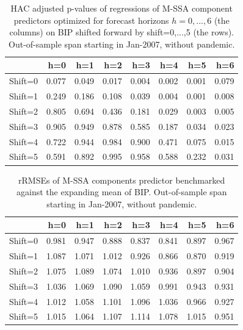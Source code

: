 \documentclass[a4paper]{article}
\begin{document}

\begin{table}[ht]
\centering
\begin{tabular}{rrrrrrrr}
  \hline
 & h=0 & h=1 & h=2 & h=3 & h=4 & h=5 & h=6 \\ 
  \hline
Shift=0 & 0.077 & 0.049 & 0.017 & 0.004 & 0.002 & 0.001 & 0.079 \\ 
  Shift=1 & 0.249 & 0.186 & 0.108 & 0.039 & 0.004 & 0.001 & 0.008 \\ 
  Shift=2 & 0.805 & 0.694 & 0.436 & 0.181 & 0.029 & 0.003 & 0.005 \\ 
  Shift=3 & 0.905 & 0.949 & 0.878 & 0.585 & 0.187 & 0.034 & 0.023 \\ 
  Shift=4 & 0.722 & 0.944 & 0.984 & 0.900 & 0.471 & 0.075 & 0.015 \\ 
  Shift=5 & 0.591 & 0.892 & 0.995 & 0.958 & 0.588 & 0.232 & 0.031 \\ 
   \hline
\end{tabular}
\caption{HAC adjusted p-values of regressions of M-SSA component predictors optimized for forecast horizons $h=0,...,6$  (the columns) on BIP shifted forward by shift=0,...,5 (the rows). Out-of-sample span starting in Jan-2007, without pandemic.} 
\label{p_val_wc}
\end{table}%
\begin{table}[ht]
\centering
\begin{tabular}{rrrrrrrr}
  \hline
 & h=0 & h=1 & h=2 & h=3 & h=4 & h=5 & h=6 \\ 
  \hline
Shift=0 & 0.981 & 0.947 & 0.888 & 0.837 & 0.841 & 0.897 & 0.967 \\ 
  Shift=1 & 1.087 & 1.071 & 1.012 & 0.926 & 0.866 & 0.870 & 0.919 \\ 
  Shift=2 & 1.075 & 1.089 & 1.074 & 1.010 & 0.936 & 0.897 & 0.904 \\ 
  Shift=3 & 1.036 & 1.069 & 1.090 & 1.059 & 0.991 & 0.943 & 0.931 \\ 
  Shift=4 & 1.012 & 1.058 & 1.101 & 1.096 & 1.036 & 0.966 & 0.927 \\ 
  Shift=5 & 1.015 & 1.064 & 1.107 & 1.114 & 1.078 & 1.015 & 0.951 \\ 
   \hline
\end{tabular}
\caption{rRMSEs of M-SSA components predictor benchmarked against the expanding mean of BIP. Out-of-sample span starting in Jan-2007, without pandemic.} 
\label{rRMSE_mSSA_comp_mean_wc}
\end{table}
\end{document}
